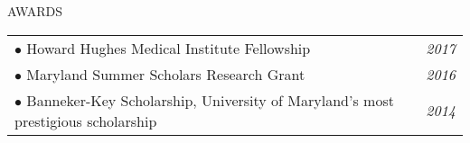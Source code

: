 \documentclass{resume} %
\begin{document}




\begin{rSection}{AWARDS}


\begin{tabular}{p{14cm}R{2.5cm}}
$\bullet$ Howard Hughes Medical Institute Fellowship  &  \it{2017}  \\ 
$\bullet$ Maryland Summer Scholars Research Grant  & \it{2016}  \\ 
$\bullet$ Banneker-Key Scholarship, University of Maryland's most prestigious scholarship & \it{2014}
\end{tabular} 


\end{rSection}
 
\end{document}

